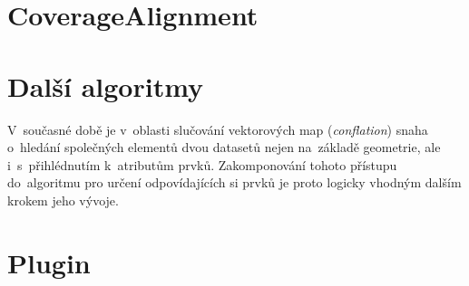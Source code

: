 

\section{CoverageAlignment}
\label{ca-vyvoj}







\section{Další algoritmy}



V~současné době je v~oblasti slučování vektorových map (\textit{conflation}) snaha
o~hledání společných elementů dvou datasetů nejen na~základě geometrie, ale i~s~přihlédnutím
k~atributům prvků. Zakomponování tohoto přístupu do~algoritmu pro určení odpovídajících si
prvků je proto logicky vhodným dalším krokem jeho vývoje.

\section{Plugin}
